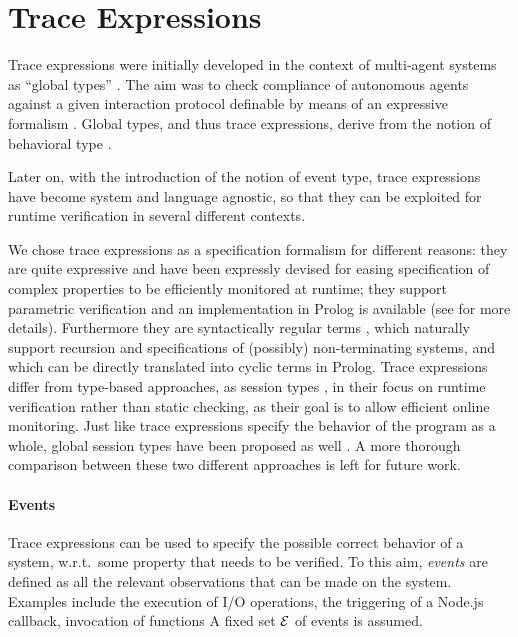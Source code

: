 \section{Trace Expressions}
\label{sec:trace}
Trace expressions were initially developed in the context of multi-agent systems as ``global types'' \cite{AnconaDM12}.
The aim was to check compliance of autonomous agents against a given interaction protocol definable by means of an expressive
formalism \cite{AnconaBFMT14, BriolaMA14}.
Global types, and thus trace expressions, derive from the notion of behavioral type \cite{AnconaBB0CDGGGH16}.

Later on, with the introduction of the notion of event type, trace expressions have become system and language agnostic, so that they can be exploited for runtime verification in several different contexts.


We chose trace expressions as a specification formalism for different reasons: they are quite expressive \cite{ancona2016comparing} and have been expressly devised for easing specification of complex properties to be efficiently monitored at runtime; they support parametric verification \cite{AnconaFM17} and an implementation in Prolog is available (see \cite{TowardsIoT17} for more details).
Furthermore they are syntactically regular terms \cite{Courcelle83}, which naturally support recursion and specifications of (possibly) non-terminating systems, and which can be directly translated into cyclic terms in Prolog.
Trace expressions differ from type-based approaches, as session types \cite{sessiontypes}, in their focus on runtime verification rather than static checking, as their goal is to allow efficient online monitoring.
Just like trace expressions specify the behavior of the program as a whole, global session types have been proposed as well \cite{globalst,Vasconcelos11}.
A more thorough comparison between these two different approaches is left for future work.

\paragraph{Events}
Trace expressions can be used to specify the possible correct behavior of a system, w.r.t.\ some property that needs to be verified.
To this aim, \emph{events} are defined as all the relevant observations that can be made on the system.
Examples include the execution of I/O operations, the triggering of a Node.js callback, invocation of functions\textellipsis{} A fixed set \(\mathcal{E}\) of events is assumed.

